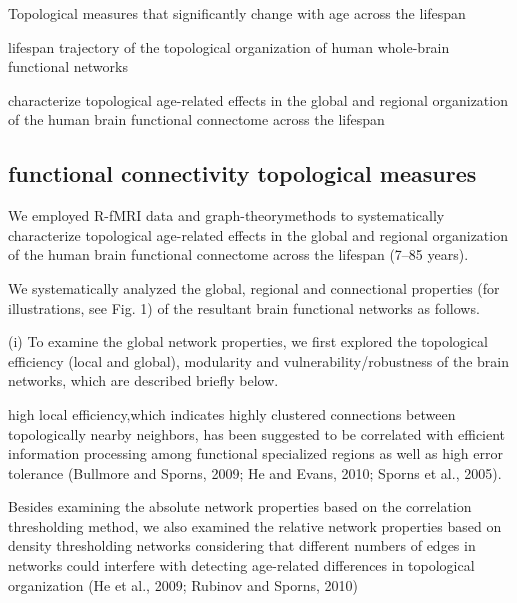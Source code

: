 Topological measures that significantly change with age across the lifespan

lifespan trajectory of the topological organization of human whole-brain functional networks

characterize topological age-related effects in the global and regional organization of the human brain
functional connectome across the lifespan

\subsection{functional connectivity topological measures}

We employed R-fMRI data and graph-theorymethods to
systematically characterize topological age-related effects
in the global and regional organization of the human brain
functional connectome across the lifespan (7–85 years).

We systematically analyzed the global, regional and
connectional properties (for illustrations, see Fig. 1) of the
resultant brain functional networks as follows.

(i) To examine the global network properties, we first
explored the topological efficiency (local and global), modularity and 
vulnerability/robustness of the brain networks, which are
described briefly below.

high local efficiency,which indicates highly clustered connections between 
topologically
nearby neighbors, has been suggested to be correlated with
efficient information processing among functional specialized regions as 
well as high error tolerance (Bullmore and
Sporns, 2009; He and Evans, 2010; Sporns et al., 2005).

Besides examining the absolute network properties based on the 
correlation thresholding method, we
also examined the relative network properties based on
density thresholding networks considering that different
numbers of edges in networks could interfere with detecting 
age-related differences in topological organization (He
et al., 2009; Rubinov and Sporns, 2010)

